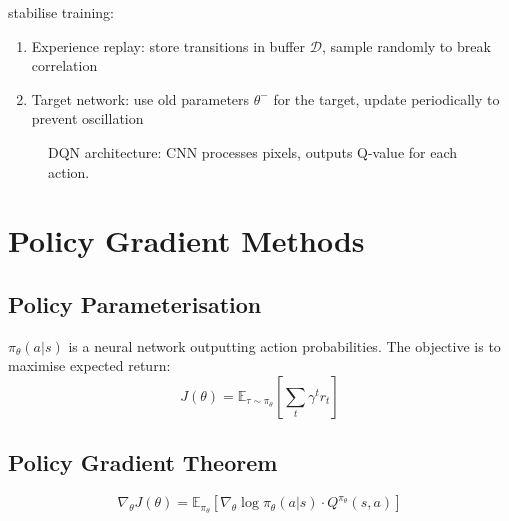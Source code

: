  stabilise training:
\begin{enumerate}
    \item Experience replay: store transitions in buffer $\mathcal{D}$, sample randomly to break correlation
    \item Target network: use old parameters $\theta^-$ for the target, update periodically to prevent oscillation
\end{enumerate}

\begin{figure}
\centering
{}
\caption{DQN architecture: CNN processes pixels, outputs Q-value for each action.}
\label{fig:dqn}
\end{figure}


\section{Policy Gradient Methods}


\subsection{Policy Parameterisation}

 $\pi_\theta(a|s)$ is a neural network outputting action probabilities. The objective is to maximise expected return:
\begin{equation}
    J(\theta) = \mathbb{E}_{\tau \sim \pi_\theta} \left[ \sum_t \gamma^t r_t \right]
\end{equation}

\subsection{Policy Gradient Theorem}

\begin{equation}
    \nabla_\theta J(\theta) = \mathbb{E}_{\pi_\theta} \left[ \nabla_\theta \log \pi_\theta(a|s) \cdot Q^{\pi_\theta}(s,a) \right]
\end{equation}

